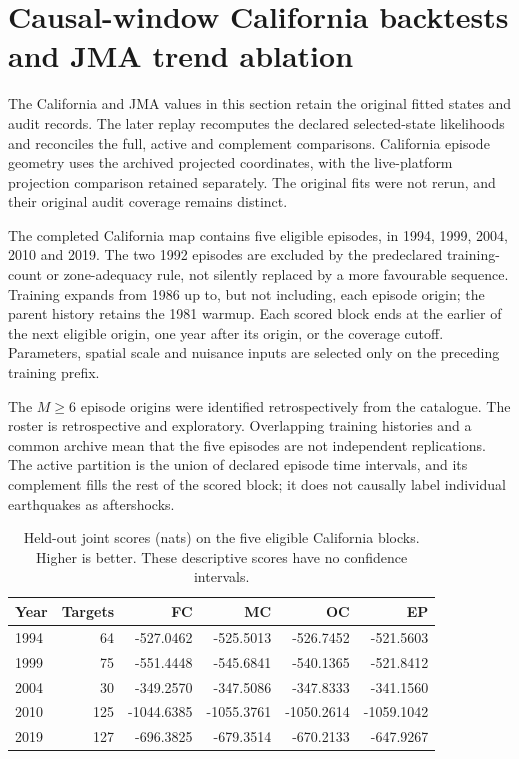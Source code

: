 \section{Causal-window California backtests and JMA trend ablation}

\label{sec:s06-completed}

The California and JMA values in this section retain the original fitted states and audit records. The later replay recomputes the declared selected-state likelihoods and reconciles the full, active and complement comparisons. California episode geometry uses the archived projected coordinates, with the live-platform projection comparison retained separately. The original fits were not rerun, and their original audit coverage remains distinct.

The completed California map contains five eligible episodes, in 1994, 1999, 2004, 2010 and 2019. The two 1992 episodes are excluded by the predeclared training-count or zone-adequacy rule, not silently replaced by a more favourable sequence. Training expands from 1986 up to, but not including, each episode origin; the parent history retains the 1981 warmup. Each scored block ends at the earlier of the next eligible origin, one year after its origin, or the coverage cutoff. Parameters, spatial scale and nuisance inputs are selected only on the preceding training prefix.

The $M\geq6$ episode origins were identified retrospectively from the catalogue. The roster is retrospective and exploratory. Overlapping training histories and a common archive mean that the five episodes are not independent replications. The active partition is the union of declared episode time intervals, and its complement fills the rest of the scored block; it does not causally label individual earthquakes as aftershocks.

\begin{table}[htbp]\centering\caption{Held-out joint scores (nats) on the five eligible California blocks. Higher is better. These descriptive scores have no confidence intervals.}\label{tab:s06-ca}

\begin{tabular}{lrrrrr}\toprule Year & Targets & FC & MC & OC & EP\\\midrule

1994 & 64 & -527.0462 & -525.5013 & -526.7452 & -521.5603 \\

1999 & 75 & -551.4448 & -545.6841 & -540.1365 & -521.8412 \\

2004 & 30 & -349.2570 & -347.5086 & -347.8333 & -341.1560 \\

2010 & 125 & -1044.6385 & -1055.3761 & -1050.2614 & -1059.1042 \\

2019 & 127 & -696.3825 & -679.3514 & -670.2133 & -647.9267 \\

\bottomrule\end{tabular}\end{table}

